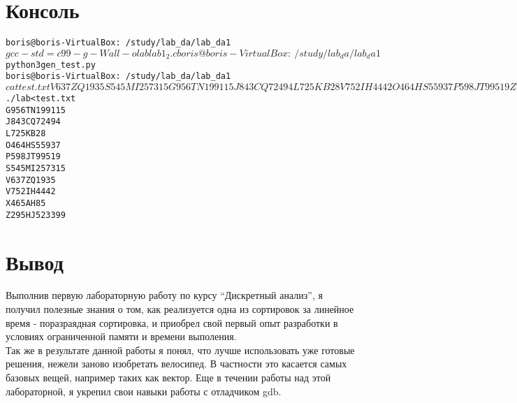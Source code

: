 \documentclass[pdf, unicode, 12pt, a4paper,oneside,fleqn]{article}
\begin{document}
\section{Консоль}
\begin{alltt}

  boris@boris-VirtualBox:~/study/lab_da/lab_da1$ gcc -std=c99 -g -Wall -o lab lab1_2.c
  boris@boris-VirtualBox:~/study/lab_da/lab_da1$ python3 gen_test.py
  boris@boris-VirtualBox:~/study/lab_da/lab_da1$ cat test.txt
  V 637 ZQ 1935
  S 545 MI 257315
  G 956 TN 199115
  J 843 CQ 72494
  L 725 KB 28
  V 752 IH 4442
  O 464 HS 55937
  P 598 JT 99519
  Z 295 HJ 523399
  X 465 AH 85
  
  boris@boris-VirtualBox:~/study/lab_da/lab_da1$ ./lab < test.txt
  G 956 TN        199115
  J 843 CQ        72494
  L 725 KB        28
  O 464 HS        55937
  P 598 JT        99519
  S 545 MI        257315
  V 637 ZQ        1935
  V 752 IH        4442
  X 465 AH        85
  Z 295 HJ        523399

\end{alltt}
\pagebreak
\section{Вывод}
Выполнив первую лабораторную работу по курсу \enquote{Дискретный анализ}, я получил полезные знания о том, как реализуется одна из 
сортировок за линейное время - поразраядная сортировка, и приобрел свой первый опыт разработки в условиях ограниченной памяти и времени выполения. \\
Так же в результате данной работы я понял, что лучше использовать уже готовые решения, нежели заново изобретать велосипед. В частности это
касается самых базовых вещей, например таких как вектор. Еще в течении работы над этой лабораторной, я укрепил свои навыки работы с отладчиком gdb.\\
\end{document}
